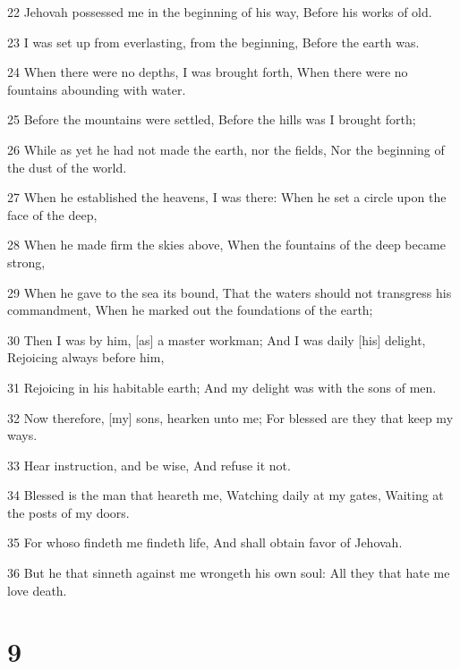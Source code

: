 \par 22 Jehovah possessed me in the beginning of his way, Before his works of old.
\par 23 I was set up from everlasting, from the beginning, Before the earth was.
\par 24 When there were no depths, I was brought forth, When there were no fountains abounding with water.
\par 25 Before the mountains were settled, Before the hills was I brought forth;
\par 26 While as yet he had not made the earth, nor the fields, Nor the beginning of the dust of the world.
\par 27 When he established the heavens, I was there: When he set a circle upon the face of the deep,
\par 28 When he made firm the skies above, When the fountains of the deep became strong,
\par 29 When he gave to the sea its bound, That the waters should not transgress his commandment, When he marked out the foundations of the earth;
\par 30 Then I was by him, [as] a master workman; And I was daily [his] delight, Rejoicing always before him,
\par 31 Rejoicing in his habitable earth; And my delight was with the sons of men.
\par 32 Now therefore, [my] sons, hearken unto me; For blessed are they that keep my ways.
\par 33 Hear instruction, and be wise, And refuse it not.
\par 34 Blessed is the man that heareth me, Watching daily at my gates, Waiting at the posts of my doors.
\par 35 For whoso findeth me findeth life, And shall obtain favor of Jehovah.
\par 36 But he that sinneth against me wrongeth his own soul: All they that hate me love death.

\chapter{9}


